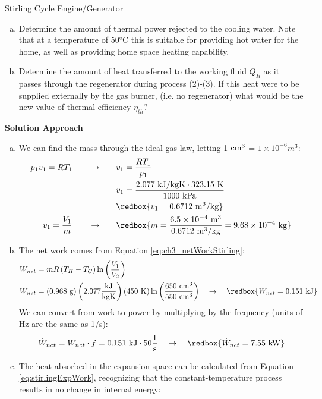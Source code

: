 \begin{example}{Stirling Cycle Engine/Generator}
\begin{enumerate}[a)]
  \item Determine the amount of thermal power rejected to the cooling water. Note that at a temperature of 50°C this is suitable for providing hot water for the home, as well as providing home space heating capability.
    
  \item Determine the amount of heat transferred to the working fluid $Q_R$ as it passes through the regenerator during process (2)-(3). If this heat were to be supplied externally by the gas burner, (i.e. no regenerator) what would be the new value of thermal efficiency $\eta_{th}$? 
  \end{enumerate}
  
  {\bf Solution Approach}
  \begin{enumerate}[a)]
  \item  We can find the mass through the ideal gas law, letting 1 $\rm cm^3$ = $1\times 10^{-6}m^3$:
    \begin{align*}
      p_1v_1=RT_1 \quad\quad \rightarrow & \quad\quad v_1 = \frac{RT_1}{p_1} \\
      & \quad\quad v_1 = \frac{2.077 {\rm\ kJ/kgK} \cdot 323.15{\rm\ K}}{1000\ \rm kPa} \\
      & \quad\quad \redbox{v_1 = 0.6712 \rm\ m^3/kg} \\
      v_1 = \frac{V_1}{m} \quad\quad \rightarrow & \quad\quad \redbox{m = \frac{6.5\times 10^{-4} \rm\ m^3}{0.6712\ \rm m^3/kg} = 9.68\times 10^{-4}\ \rm kg}
    \end{align*}
  \item The net work comes from Equation \ref{eq:ch3_netWorkStirling}:
    \begin{align*}
      W_{net} &= m R \left(T_H-T_C\right) \ln{\left(\frac{V_1}{V_2}\right)} \\
      W_{net} &= ({0.968\ \rm g}) \left(2.077\frac{\rm kJ}{\rm kg K}\right) (450\ {\rm K}) \ln{\left(\frac{650\ \rm cm^3}{550\ \rm cm^3}\right)} \quad\rightarrow\quad \redbox{W_{net} = 0.151\ \rm kJ}
    \end{align*}
    We can convert from work to power by multiplying by the frequency (units of Hz are the same as 1/s):
    \begin{equation*}
      \dot{W}_{net} = W_{net} \cdot f = {0.151\ \rm kJ} \cdot 50 \frac{1}{\rm s} \quad\rightarrow\quad \redbox{\dot{W}_{net} = 7.55\rm\ kW}
    \end{equation*}
  \item The heat absorbed in the expansion space can be calculated from Equation \ref{eq:stirlingExpWork}, recognizing that the constant-temperature process results in no change in internal energy:

\end{enumerate}
\end{example}
